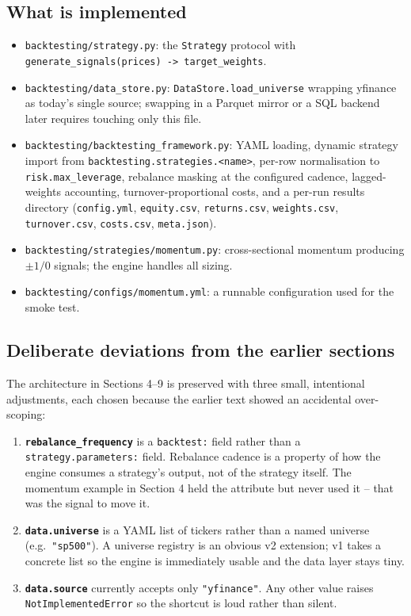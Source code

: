 \documentclass[11pt]{article}
\begin{document}
\subsection*{What is implemented}
\begin{itemize}
    \item \texttt{backtesting/strategy.py}: the \texttt{Strategy}
          protocol with \texttt{generate\_signals(prices) ->
          target\_weights}.
    \item \texttt{backtesting/data\_store.py}: \texttt{DataStore.load\_universe}
          wrapping yfinance as today's single source; swapping in a
          Parquet mirror or a SQL backend later requires touching only
          this file.
    \item \texttt{backtesting/backtesting\_framework.py}: YAML loading,
          dynamic strategy import from \texttt{backtesting.strategies.<name>},
          per-row normalisation to \texttt{risk.max\_leverage}, rebalance
          masking at the configured cadence, lagged-weights accounting,
          turnover-proportional costs, and a per-run results directory
          (\texttt{config.yml}, \texttt{equity.csv}, \texttt{returns.csv},
          \texttt{weights.csv}, \texttt{turnover.csv}, \texttt{costs.csv},
          \texttt{meta.json}).
    \item \texttt{backtesting/strategies/momentum.py}: cross-sectional
          momentum producing $\pm 1 / 0$ signals; the engine handles all
          sizing.
    \item \texttt{backtesting/configs/momentum.yml}: a runnable
          configuration used for the smoke test.
\end{itemize}

\subsection*{Deliberate deviations from the earlier sections}
The architecture in Sections 4--9 is preserved with three small,
intentional adjustments, each chosen because the earlier text showed an
accidental over-scoping:

\begin{enumerate}
    \item \textbf{\texttt{rebalance\_frequency}} is a \texttt{backtest:}
          field rather than a \texttt{strategy.parameters:} field.
          Rebalance cadence is a property of how the engine consumes a
          strategy's output, not of the strategy itself. The momentum
          example in Section 4 held the attribute but never used it --
          that was the signal to move it.
    \item \textbf{\texttt{data.universe}} is a YAML list of tickers
          rather than a named universe (e.g.\ \texttt{"sp500"}).
          A universe registry is an obvious v2 extension; v1 takes a
          concrete list so the engine is immediately usable and the
          data layer stays tiny.
    \item \textbf{\texttt{data.source}} currently accepts only
          \texttt{"yfinance"}. Any other value raises
          \texttt{NotImplementedError} so the shortcut is loud rather
          than silent.
\end{enumerate}
\end{document}

